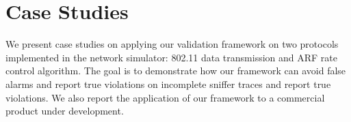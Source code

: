\section{Case Studies}
\label{sec:case}

We present case studies on applying our validation framework on two protocols
implemented in the \ns{} network simulator: 802.11 data transmission and ARF
rate control algorithm. The goal is to demonstrate how our framework can avoid
false alarms and report true violations on incomplete sniffer traces and report
true violations. We also report the application of our framework to a commercial
product under development.




